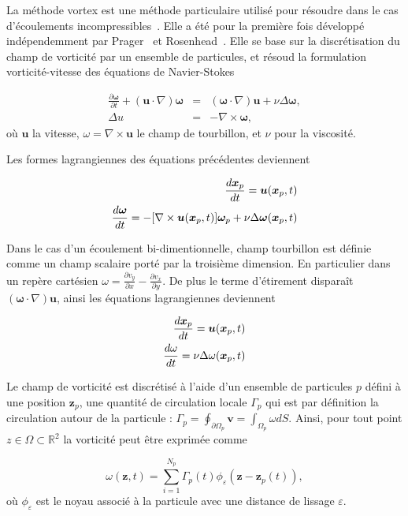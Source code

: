 La méthode vortex est une méthode particulaire utilisé pour résoudre  dans le cas d'écoulements incompressibles~\cite{Cottet_Koumoutsakos_2000}. Elle a été pour la première fois développé indépendemment par Prager~\cite{prager1928druckverteilung} et Rosenhead~\cite{rosenhead1931formation}. Elle se base sur la discrétisation du champ de vorticité par un ensemble de particules, et résoud la formulation vorticité-vitesse des équations de Navier-Stokes

\begin{eqnarray*}
    \frac{\partial \bm \omega}{\partial t} + (\bm{u} \cdot \nabla) \bm \omega & = &(\bm \omega \cdot \nabla) \bm u + \nu \Delta \bm \omega, \\
    \Delta u  & =&  -\nabla \times \bm \omega,
\end{eqnarray*}où $\bm{u}$ la vitesse, $\omega= \nabla \times \bm u$ le champ de tourbillon, et $\nu$ pour la viscosité.

Les formes lagrangiennes des équations précédentes deviennent

\begin{eqnarray*}
    \frac{d \bm{x}_p}{dt} = \bm u(\bm{x}_p, t) \\
    \frac{d\bm \omega}{dt} = - [\nabla \times \bm u (\bm{x}_p, t)]\bm \omega_p + \nu \Delta \bm \omega(\bm{x}_p, t)
\end{eqnarray*}

Dans le cas d'un écoulement bi-dimentionnelle, champ tourbillon est définie comme un champ scalaire porté par la troisième dimension. En particulier dans un repère cartésien $\omega = \frac{\partial v_y}{\partial x} - \frac{\partial v_x}{\partial y}$. De plus le terme d'étirement disparaît $(\bm \omega \cdot \nabla) \bm u$, ainsi les équations lagrangiennes deviennent

\begin{eqnarray*}
    \frac{d \bm{x}_p}{dt} = \bm u(\bm{x}_p, t) \\
    \frac{d\omega}{dt} = \nu \Delta \omega(\bm{x}_p, t)
\end{eqnarray*}

Le champ de vorticité est discrétisé à l'aide d'un ensemble de particules $p$ défini à une position $\bm z_p$, une quantité de circulation locale $\Gamma_p$ qui est par définition la circulation autour de la particule : $\Gamma_p = \oint_{\partial \Omega_p} \bm v = \int_{\Omega_p} \omega dS$. Ainsi, pour tout point $z \in \Omega \subset \mathbb R^2$ la vorticité peut être exprimée comme

\begin{equation*}
    \omega(\bm z, t) = \sum_{i=1}^{N_p} \Gamma_p(t) \phi_\varepsilon(\bm z - \bm z_p(t)),
\end{equation*}où $\phi_\varepsilon$ est le noyau associé à la particule avec une distance de lissage $\varepsilon$.

